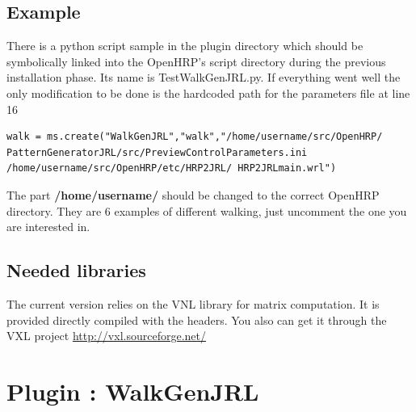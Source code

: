 \subsection{Example}
There is a python script sample in the plugin directory which should be symbolically linked into the OpenHRP's 
script directory during the previous installation phase. Its name is TestWalkGenJRL.py.
If everything went well the only modification to be done is the hardcoded path for
the parameters file at line 16
\begin{verbatim}
walk = ms.create("WalkGenJRL","walk","/home/username/src/OpenHRP/
PatternGeneratorJRL/src/PreviewControlParameters.ini 
/home/username/src/OpenHRP/etc/HRP2JRL/ HRP2JRLmain.wrl")
\end{verbatim}
The part 
{\bf /home/username/ } 
should be changed to the correct OpenHRP directory.
They are 6 examples of different walking, just uncomment the one you are interested in.

\subsection{Needed libraries}
The current version relies on the VNL library for matrix computation. It is provided directly compiled with the headers.
You also can get it through the VXL project 
\href{http://vxl.sourceforge.net/}{http://vxl.sourceforge.net/}

\section{Plugin : WalkGenJRL}

